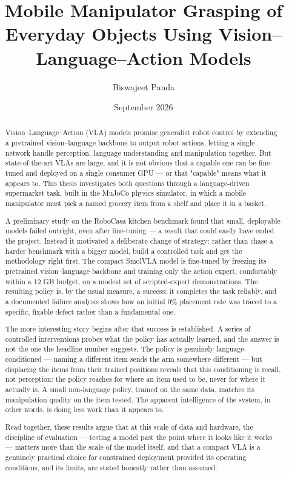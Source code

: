 \documentclass[12pt,oneside]{book}
\title{Mobile Manipulator Grasping of Everyday Objects Using Vision--Language--Action Models}
\author{Biswajeet Panda}
\date{September 2026}
\begin{document}
\frontmatter
\maketitle

\begin{abstract}
Vision–Language–Action (VLA) models promise generalist robot control by extending a pretrained vision–language backbone to output robot actions, letting a single network handle perception, language understanding and manipulation together. But state-of-the-art VLAs are large, and it is not obvious that a capable one can be fine-tuned and deployed on a single consumer GPU — or that "capable" means what it appears to. This thesis investigates both questions through a language-driven supermarket task, built in the MuJoCo physics simulator, in which a mobile manipulator must pick a named grocery item from a shelf and place it in a basket.

A preliminary study on the RoboCasa kitchen benchmark found that small, deployable models failed outright, even after fine-tuning — a result that could easily have ended the project. Instead it motivated a deliberate change of strategy: rather than chase a harder benchmark with a bigger model, build a controlled task and get the methodology right first. The compact SmolVLA model is fine-tuned by freezing its pretrained vision–language backbone and training only the action expert, comfortably within a 12 GB budget, on a modest set of scripted-expert demonstrations. The resulting policy is, by the usual measure, a success: it completes the task reliably, and a documented failure analysis shows how an initial 0\% placement rate was traced to a specific, fixable defect rather than a fundamental one.

The more interesting story begins after that success is established. A series of controlled interventions probes what the policy has actually learned, and the answer is not the one the headline number suggests. The policy is genuinely language-conditioned — naming a different item sends the arm somewhere different — but displacing the items from their trained positions reveals that this conditioning is recall, not perception: the policy reaches for where an item used to be, never for where it actually is. A small non-language policy, trained on the same data, matches its manipulation quality on the item tested. The apparent intelligence of the system, in other words, is doing less work than it appears to.

Read together, these results argue that at this scale of data and hardware, the discipline of evaluation — testing a model past the point where it looks like it works — matters more than the scale of the model itself, and that a compact VLA is a genuinely practical choice for constrained deployment provided its operating conditions, and its limits, are stated honestly rather than assumed.

\end{abstract}
\end{document}
